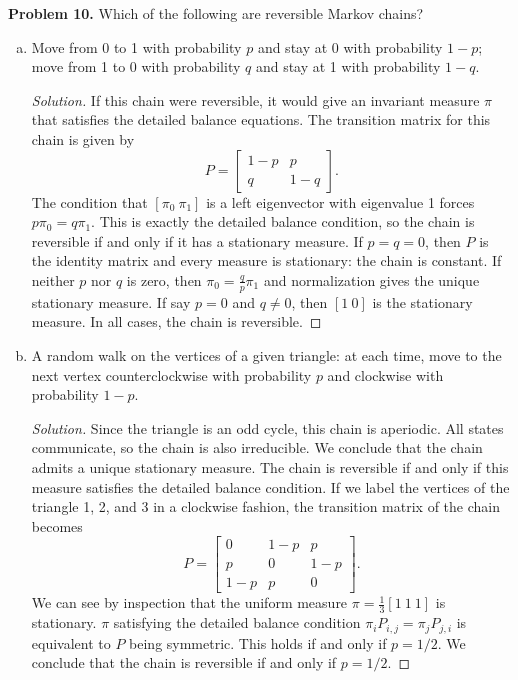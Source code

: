 \documentclass[11pt,letterpaper]{report}
\newenvironment{solution}
{\begin{proof}[Solution]}
{\end{proof}}
\begin{document}
\noindent\textbf{Problem 10. }
Which of the following are reversible Markov chains?
\begin{enumerate}[(a)]
	\item Move from 0 to 1 with probability $p$ and stay at 0 with probability $1-p$; move from 1 to 0 with probability $q$ and stay at 1 with probability $1-q$.
	\begin{solution}
		If this chain were reversible, it would give an invariant measure $\pi$ that satisfies the detailed balance equations. The transition matrix for this chain is given by
		\[
		P = \begin{bmatrix}
			1-p & p\\
			q & 1-q
		\end{bmatrix}.
		\]
		The condition that $[\pi_0\ \pi_1]$ is a left eigenvector with eigenvalue 1 forces $p\pi_0 = q\pi_1$. This is exactly the detailed balance condition, so the chain is reversible if and only if it has a stationary measure. If $p = q= 0$, then $P$ is the identity matrix and every measure is stationary: the chain is constant. If neither $p$ nor $q$ is zero, then $\pi_0 = \frac{q}{p}\pi_1$ and normalization gives the unique stationary measure. If say $p = 0$ and $q\neq 0$, then $[1\ 0]$ is the stationary measure. In all cases, the chain is reversible.
	\end{solution}

	\item A random walk on the vertices of a given triangle: at each time, move to the next vertex counterclockwise with probability $p$ and clockwise with probability $1-p$.
	\begin{solution}
		Since the triangle is an odd cycle, this chain is aperiodic. All states communicate, so the chain is also irreducible. We conclude that the chain admits a unique stationary measure. The chain is reversible if and only if this measure satisfies the detailed balance condition. If we label the vertices of the triangle 1, 2, and 3 in a clockwise fashion, the transition matrix of the chain becomes
		\[
		P = \begin{bmatrix}
			0 & 1-p & p\\
			p & 0 & 1-p\\
			1-p & p & 0
		\end{bmatrix}.
		\]
		We can see by inspection that the uniform measure $\pi = \frac{1}{3}[1\ 1\ 1]$ is stationary. $\pi$ satisfying the detailed balance condition $\pi_i P_{i,j} = \pi_jP_{j,i}$ is equivalent to $P$ being symmetric. This holds if and only if $p = 1/2$. We conclude that the chain is reversible if and only if $p=1/2$.
	\end{solution}
\end{enumerate}
\end{document}

